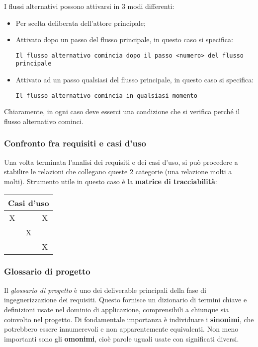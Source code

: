 \documentclass[a4paper,11pt]{article}
\begin{document}
I flussi alternativi possono attivarsi in 3 modi differenti:
\begin{itemize}
	\item Per scelta deliberata dell'attore principale;
	\item Attivato dopo un passo del flusso principale, in questo caso si specifica:
\begin{lstlisting}[style=codestyle]	
Il flusso alternativo comincia dopo il passo <numero> del flusso principale
\end{lstlisting}
	\item Attivato ad un passo qualsiasi del flusso principale, in questo caso si specifica:
\begin{lstlisting}[style=codestyle]	
Il flusso alternativo comincia in qualsiasi momento 
\end{lstlisting}
\end{itemize}

Chiaramente, in ogni caso deve esserci una condizione che si verifica perché il flusso alternativo cominci.

\subsubsection{Confronto fra requisiti e casi d'uso}
Una volta terminata l'analisi dei requisiti e dei casi d'uso, si può procedere a stabilire le relazioni che collegano queste 2 categorie (una relazione molti a molti).
Strumento utile in questo caso è la \textbf{matrice di tracciabilità}:

\begin{center}
\begin{tabular}[b]{| c | c | c |}
  \multicolumn{3}{c}{Casi d'uso} \\
	\hline
	X & & X \\
	\hline
		& X & \\
		\hline
		& & X \\
	 \hline
\end{tabular}
\end{center}

\subsubsection{Glossario di progetto}
Il \textit{glossario di progetto} è uno dei deliverable principali della fase di ingegnerizzazione dei requisiti.
Questo fornisce un dizionario di termini chiave e definizioni usate nel dominio di applicazione, comprensibili a chiunque sia coinvolto nel progetto.
Di fondamentale importanza è individuare i \textbf{sinonimi}, che potrebbero essere innumerevoli e non apparentemente equivalenti.
Non meno importanti sono gli \textbf{omonimi}, cioè parole uguali usate con significati diversi. 
\end{document}
